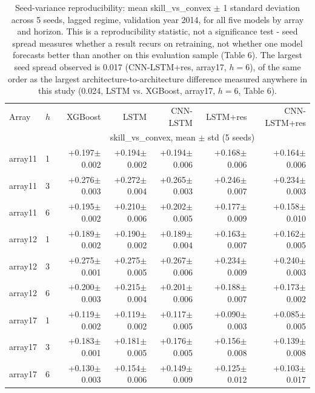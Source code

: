 \begin{table}[t]
  \centering
  \small
  \caption{Seed-variance reproducibility: mean skill\_vs\_convex $\pm$ 1 standard deviation across 5 seeds, lagged regime, validation year 2014, for all five models by array and horizon. This is a reproducibility statistic, not a significance test - seed spread measures whether a result recurs on retraining, not whether one model forecasts better than another on this evaluation sample (Table 6). The largest seed spread observed is 0.017 (CNN-LSTM+res, array17, $h=6$), of the same order as the largest architecture-to-architecture difference measured anywhere in this study (0.024, LSTM vs. XGBoost, array17, $h=6$, Table 6).}
  \label{tab:T3}
  \begin{tabular}{ll rrrrr}
    \toprule
    Array & $h$ & XGBoost & LSTM & CNN-LSTM & LSTM+res & CNN-LSTM+res \\
    & & \multicolumn{5}{c}{skill\_vs\_convex, mean $\pm$ std (5 seeds)} \\
    \midrule
    array11 & 1 & +0.197$\pm$0.002 & +0.194$\pm$0.002 & +0.194$\pm$0.006 & +0.168$\pm$0.006 & +0.164$\pm$0.006 \\
    array11 & 3 & +0.276$\pm$0.003 & +0.272$\pm$0.004 & +0.265$\pm$0.003 & +0.246$\pm$0.007 & +0.234$\pm$0.003 \\
    array11 & 6 & +0.195$\pm$0.002 & +0.210$\pm$0.006 & +0.202$\pm$0.005 & +0.177$\pm$0.009 & +0.158$\pm$0.010 \\
    array12 & 1 & +0.189$\pm$0.002 & +0.190$\pm$0.002 & +0.189$\pm$0.004 & +0.163$\pm$0.007 & +0.162$\pm$0.005 \\
    array12 & 3 & +0.275$\pm$0.001 & +0.275$\pm$0.005 & +0.267$\pm$0.006 & +0.234$\pm$0.009 & +0.240$\pm$0.003 \\
    array12 & 6 & +0.200$\pm$0.003 & +0.215$\pm$0.004 & +0.201$\pm$0.006 & +0.188$\pm$0.007 & +0.173$\pm$0.002 \\
    array17 & 1 & +0.119$\pm$0.002 & +0.119$\pm$0.002 & +0.117$\pm$0.005 & +0.090$\pm$0.003 & +0.085$\pm$0.005 \\
    array17 & 3 & +0.183$\pm$0.001 & +0.181$\pm$0.005 & +0.176$\pm$0.005 & +0.156$\pm$0.008 & +0.139$\pm$0.008 \\
    array17 & 6 & +0.130$\pm$0.003 & +0.154$\pm$0.006 & +0.149$\pm$0.009 & +0.125$\pm$0.012 & +0.103$\pm$0.017 \\
    \bottomrule
  \end{tabular}
\end{table}
